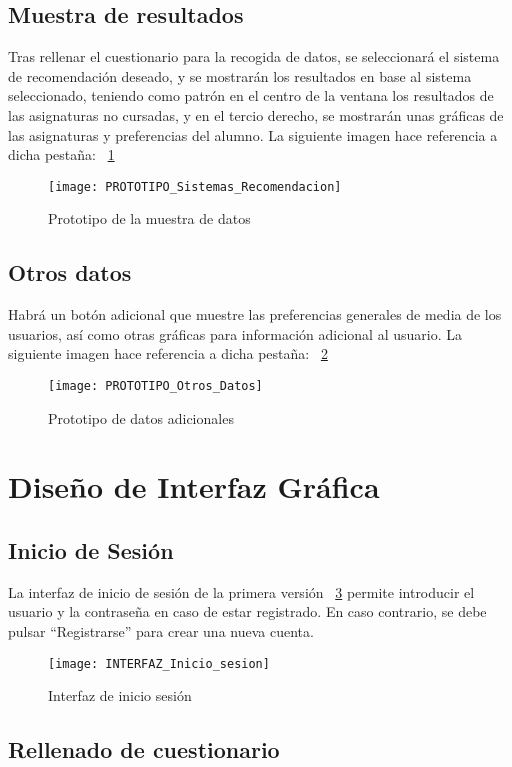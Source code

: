 \subsection{Muestra de resultados}
Tras rellenar el cuestionario para la recogida de datos, se seleccionará el sistema de recomendación deseado, y se mostrarán los resultados en base al sistema seleccionado, teniendo como patrón en el centro de la ventana los resultados de las asignaturas no cursadas, y en el tercio derecho, se mostrarán unas gráficas de las asignaturas y preferencias del alumno. La siguiente imagen hace referencia a dicha pestaña: ~\ref{fig:C.2.3}
\begin{figure}[h]
\centering
\texttt{[image: PROTOTIPO\_Sistemas\_Recomendacion]}
\caption{Prototipo de la muestra de datos}
\label{fig:C.2.3}
\end{figure}

\subsection{Otros datos}
Habrá un botón adicional que muestre las preferencias generales de media de los usuarios, así como otras gráficas para información adicional al usuario. 
La siguiente imagen hace referencia a dicha pestaña: ~\ref{fig:C.2.4}
\begin{figure}[h]
\centering
\texttt{[image: PROTOTIPO\_Otros\_Datos]}
\caption{Prototipo de datos adicionales}
\label{fig:C.2.4}
\end{figure}

\section{Diseño de Interfaz Gráfica }
\subsection{Inicio de Sesión}
La interfaz de inicio de sesión de la primera versión ~\ref{fig:C.3.1}  permite introducir el usuario y la contraseña en caso de estar registrado. En caso contrario, se debe pulsar ``Registrarse'' para crear una nueva cuenta. 
\begin{figure}[h]
\centering
\texttt{[image: INTERFAZ\_Inicio\_sesion]}
\caption{Interfaz de inicio sesión}
\label{fig:C.3.1}
\end{figure}

\subsection{Rellenado de cuestionario}
